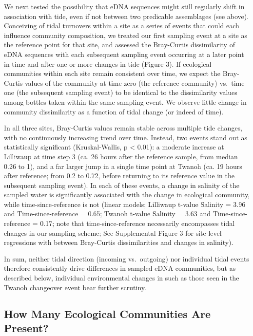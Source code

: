 \documentclass[fleqn,10pt,lineno]{wlpeerj} %
\begin{document}
We next tested the possibility that eDNA sequences might still regularly
shift in association with tide, even if not between two predicable
assemblages (see above). Conceiving of tidal turnovers within a site as
a series of events that could each influence community composition, we
treated our first sampling event at a site as the reference point for
that site, and assessed the Bray-Curtis dissimilarity of eDNA sequences
with each subsequent sampling event occurring at a later point in time
and after one or more changes in tide (Figure 3). If ecological
communities within each site remain consistent over time, we expect the
Bray-Curtis values of the community at time zero (the reference
community) vs.~time one (the subsequent sampling event) to be identical
to the dissimilarity values among bottles taken within the same sampling
event. We observe little change in community dissimilarity as a function
of tidal change (or indeed of time).

In all three sites, Bray-Curtis values remain stable across multiple
tide changes, with no continuously increasing trend over time. Instead,
two events stand out as statistically significant (Kruskal-Wallis, p
\textless{} 0.01): a moderate increase at Lilliwaup at time step 3 (ca.
26 hours after the reference sample, from median 0.26 to 1), and a far
larger jump in a single time point at Twanoh (ca. 19 hours after
reference; from 0.2 to 0.72, before returning to its reference value in
the subsequent sampling event). In each of these events, a change in
salinity of the sampled water is significantly associated with the
change in ecological community, while time-since-reference is not
(linear models; Lilliwaup t-value Salinity = 3.96 and
Time-since-reference = 0.65; Twanoh t-value Salinity = 3.63 and
Time-since-reference = 0.17; note that time-since-reference necessarily
encompasses tidal changes in our sampling scheme; See Supplemental
Figure 3 for site-level regressions with between Bray-Curtis
dissimilarities and changes in salinity).

In sum, neither tidal direction (incoming vs.~outgoing) nor individual
tidal events therefore consistently drive differences in sampled eDNA
communities, but as described below, individual environmental changes in
such as those seen in the Twanoh changeover event bear further scrutiny.

\subsection{How Many Ecological Communities Are
Present?}\label{how-many-ecological-communities-are-present-1}
\end{document}
